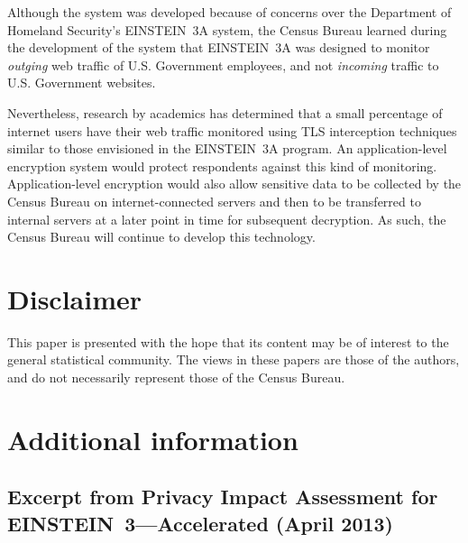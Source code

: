 \documentclass[fleqn,12pt]{wlscirep}
\begin{document}
Although the system was
developed because of concerns over the Department of Homeland
Security's EINSTEIN~3A system, the Census Bureau learned during the
development of the system that EINSTEIN~3A was designed to monitor
\emph{outging} web traffic of U.S. Government employees, and not
\emph{incoming} traffic to U.S. Government websites.

Nevertheless, research by academics has determined that a small
percentage of internet users have their web traffic monitored using
TLS interception techniques similar to those envisioned in the
EINSTEIN~3A program. An application-level encryption system would
protect respondents against this kind of monitoring. Application-level
encryption would also allow sensitive data to be collected by the
Census Bureau on internet-connected servers and then to be transferred 
to internal servers at a later point in time for subsequent
decryption. As such, the Census Bureau will continue to develop this
technology.


\section{Disclaimer}
This paper is presented with the hope that its content may be of interest to the general statistical community. The views in these papers are those of the authors, and do not necessarily represent those of the Census Bureau.

%


\section{Additional information}

\subsection{Excerpt from Privacy Impact Assessment for EINSTEIN~3---Accelerated (April 2013)}
\end{document}
